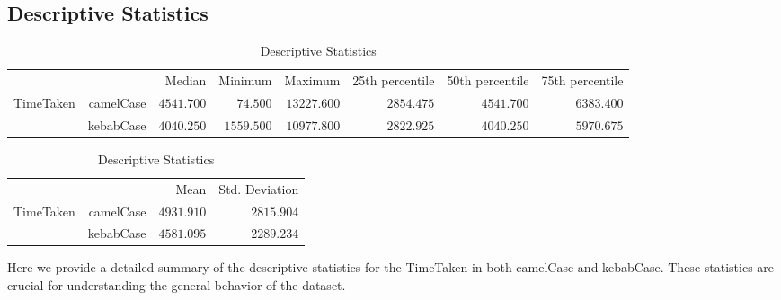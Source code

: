 \documentclass{article}
\begin{document}
\subsection{Descriptive Statistics}



\begin{table}[h]
	\centering
	\caption{Descriptive Statistics}
	\label{tab:descriptiveStatistics}
	{
		\begin{tabular}{lrrrrrrr}
			\toprule
			 &  & Median & Minimum & Maximum & 25th percentile & 50th percentile & 75th percentile  \\
			\cmidrule[0.4pt]{1-8}
			TimeTaken & camelCase & $4541.700$ & $74.500$ & $13227.600$ & $2854.475$ & $4541.700$ & $6383.400$  \\
			 & kebabCase & $4040.250$ & $1559.500$ & $10977.800$ & $2822.925$ & $4040.250$ & $5970.675$  \\
			\bottomrule
		\end{tabular}
	}
\end{table}

\begin{table}[h]
	\centering
	\caption{Descriptive Statistics}
	\label{tab:descriptiveStatistics}
	{
		\begin{tabular}{lrrr}
			\toprule
			 &  & Mean & Std. Deviation  \\
			\cmidrule[0.4pt]{1-4}
			TimeTaken & camelCase & $4931.910$ & $2815.904$  \\
			 & kebabCase & $4581.095$ & $2289.234$  \\
			\bottomrule
		\end{tabular}
	}
\end{table}

Here we provide a detailed summary of the descriptive statistics for the TimeTaken in both camelCase and kebabCase. These statistics are crucial for understanding the general behavior of the dataset.
\end{document}

